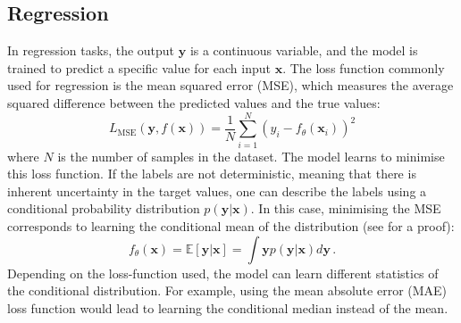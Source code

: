 \subsection{Regression}
In regression tasks, the output $\mathbf{y}$ is a continuous variable, and the model is trained to predict a specific value for each input $\mathbf{x}$. The loss function commonly used for regression is the mean squared error (MSE), which measures the average squared difference between the predicted values and the true values:
\begin{equation}
    L_{\text{MSE}}(\mathbf{y}, f(\mathbf{x})) = \frac{1}{N} \sum_{i=1}^{N} (y_i - f_\theta(\mathbf{x}_i))^2
\end{equation}
where $N$ is the number of samples in the dataset. The model learns to minimise this loss function. If the labels are not deterministic, meaning that there is inherent uncertainty in the target values, one can describe the labels using a conditional probability distribution $p(\mathbf{y}|\mathbf{x})$. In this case, minimising the MSE corresponds to learning the conditional mean of the distribution (see  for a proof):
\begin{equation}
    f_\theta(\mathbf{x}) = \mathbb{E}[\mathbf{y}|\mathbf{x}] = \int \mathbf{y} p(\mathbf{y}|\mathbf{x}) d\mathbf{y}\,.
\end{equation}
Depending on the loss-function used, the model can learn different statistics of the conditional distribution. For example, using the mean absolute error (MAE) loss function would lead to learning the conditional median instead of the mean.

